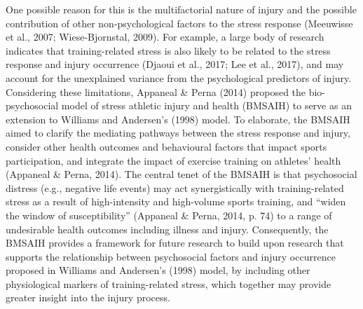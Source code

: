 \documentclass[
  english,
  man,floatsintext]{apa6}
\begin{document}
One possible reason for this is the multifactorial nature of injury and the possible contribution of other non-psychological factors to the stress response
(Meeuwisse et al., 2007; Wiese-Bjornstal, 2009).
For example, a large body of research indicates that training-related stress is also likely to be related to the stress response and injury occurrence (Djaoui et al., 2017; Lee et al., 2017),
and may account for the unexplained variance from the psychological predictors of injury.
Considering these limitations, Appaneal \& Perna (2014)
proposed the bio-psychosocial model of stress athletic injury and health (BMSAIH) to serve as an extension to Williams and Andersen's (1998) model.
To elaborate, the BMSAIH aimed to clarify the mediating pathways between the stress response and injury,
consider other health outcomes and behavioural factors that impact sports participation,
and integrate the impact of exercise training on athletes' health (Appaneal \& Perna, 2014).
The central tenet of the BMSAIH is that psychosocial distress (e.g., negative life events) may act synergistically with training-related stress as a result of high-intensity and high-volume sports training, and \enquote{widen the window of susceptibility} (Appaneal \& Perna, 2014, p. 74) to a range of undesirable health outcomes including illness and injury.
Consequently, the BMSAIH provides a framework for future research to build upon research that supports the relationship between psychosocial factors and injury occurrence proposed in Williams and Andersen's (1998) model, by including other physiological markers of training-related stress, which together may provide greater insight into the injury process.
\end{document}
